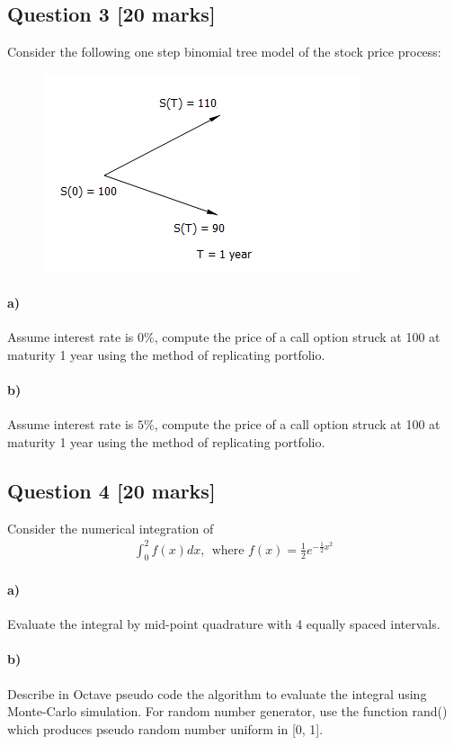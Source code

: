 \documentclass[11pt,a4paper,hidelinks,fleqn]{article}            %
\makeatletter
\newcommand\footnoteref[1]{\protected@xdef\@thefnmark{\ref{#1}}\@footnotemark}
\makeatother
\begin{document}
\subsection*{Question 3 [20 marks]}
Consider the following one step binomial tree model of the stock price process:
\begin{figure}[h]
\includegraphics[scale=0.9]{./4}
\end{figure}

\paragraph{a)} Assume interest rate is $0\%$, compute the price of a call option struck at 100 at maturity 1 year using the method of replicating portfolio.

\paragraph{b)} Assume interest rate is $5\%$, compute the price of a call option struck at 100 at maturity 1 year using the method of replicating portfolio.


\subsection*{Question 4 [20 marks]} 
Consider the numerical integration of 
\begin{align*}
\int_0^{2} f(x) dx, ~~\text{where~} f(x) = \frac{1}{2} e^{-\frac12x^2}
\end{align*}

\paragraph{a)} Evaluate the integral by mid-point quadrature with 4 equally spaced intervals. 

\paragraph{b)} Describe in Octave pseudo code\footnoteref{note1} the algorithm to evaluate the integral using Monte-Carlo simulation.
For random number generator, use the function rand() which produces pseudo random number  uniform in [0, 1].
\end{document}
